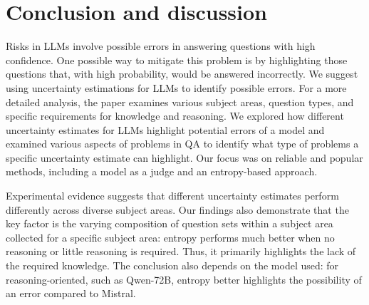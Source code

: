 \section{Conclusion and discussion}

Risks in LLMs involve possible errors in answering questions with high confidence.
One possible way to mitigate this problem is by highlighting those questions that, with high probability, would be answered incorrectly.
We suggest using uncertainty estimations for LLMs to identify possible errors.
For a more detailed analysis, the paper examines various subject areas, question types, and specific requirements for knowledge and reasoning.
We explored how different uncertainty estimates for LLMs highlight potential errors of a model and examined various aspects of problems in QA to identify what type of problems a specific uncertainty estimate can highlight.
Our focus was on reliable and popular methods, including a model as a judge and an entropy-based approach.

Experimental evidence suggests that different uncertainty estimates perform differently across diverse subject areas.
Our findings also demonstrate that the key factor is the varying composition of question sets within a subject area collected for a specific subject area: entropy performs much better when no reasoning or little reasoning is required. Thus, it primarily highlights the lack of the required knowledge. 
The conclusion also depends on the model used: for reasoning-oriented, such as Qwen-72B, entropy better highlights the possibility of an error compared to Mistral.